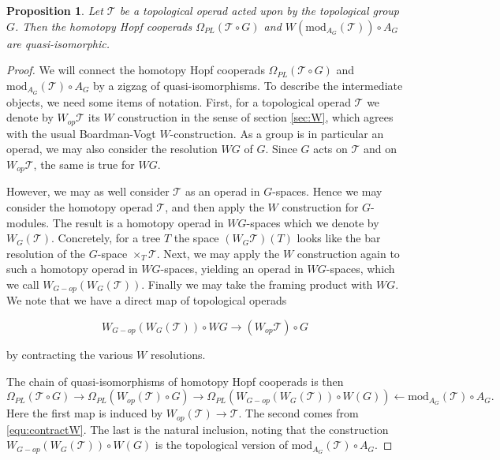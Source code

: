 \documentclass[a4paper]{amsart}
\theoremstyle{plain}
\newtheorem{prop}[thm]{Proposition}
\theoremstyle{definition}
\newcommand{\op}{\mathcal}
\renewcommand{\mod}{\mathrm{mod}}
\newcommand{\beq}[1]{
\begin{equation}\label{#1}
}
\newcommand{\eeq}{
\end{equation}
}
\begin{document}
\begin{prop}\label{prop:framedmodel}
Let $\op T$ be a topological operad acted upon by the topological group $G$. Then the homotopy Hopf cooperads $\Omega_{PL}(\op T\circ G)$ and $W(\mod_{A_G}(\op T)) \circ A_G$ are quasi-isomorphic.
\end{prop}
\begin{proof}
We will connect the homotopy Hopf cooperads $\Omega_{PL}(\op T \circ G)$ and $\mod_{A_G}(\op T) \circ A_G$ by a zigzag of quasi-isomorphisms.
To describe the intermediate objects, we need some items of notation.
First, for a topological operad $\op T$ we denote by $W_{op}\op T$ its $W$ construction in the sense of section \ref{sec:W}, which agrees with the usual Boardman-Vogt $W$-construction.
As a group is in particular an operad, we may also consider the resolution $WG$ of $G$.
Since $G$ acts on $\op T$ and on $W_{op}\op T$, the same is true for $WG$.

However, we may as well consider $\op T$ as an operad in $G$-spaces.
Hence we may consider the homotopy operad $\op T$, and then apply the $W$ construction for $G$-modules. The result is a homotopy operad in $WG$-spaces which we denote by $W_G(\op T)$.
Concretely, for a tree $T$ the space $(W_G\op T)(T)$ looks like the bar resolution of the $G$-space $\times_T \op T$.
Next, we may apply the $W$ construction again to such a homotopy operad in $WG$-spaces, yielding an operad in $WG$-spaces, which we call $W_{G-op}(W_G(\op T))$.
Finally we may take the framing product with $WG$.
We note that we have a direct map of topological operads 
\beq{equ:contractW}
W_{G-op}(W_G(\op T))\circ WG\to (W_{op}\op T) \circ G
\eeq
by contracting the various $W$ resolutions.

The chain of quasi-isomorphisms of homotopy Hopf cooperads is then
\[
\Omega_{PL}(\op T \circ G) \to \Omega_{PL}(W_{op}(\op T)\circ G) \to \Omega_{PL}(W_{G-op}(W_G(\op T))\circ W(G)) \leftarrow \mod_{A_G}(\op T) \circ A_G.
\]
Here the first map is induced by $W_{op}(\op T)\to \op T$. The second comes from \eqref{equ:contractW}.
The last is the natural inclusion, noting that the construction $W_{G-op}(W_G(\op T))\circ W(G)$ is the topological version of $\mod_{A_G}(\op T) \circ A_G$.

\end{proof}
\end{document}
